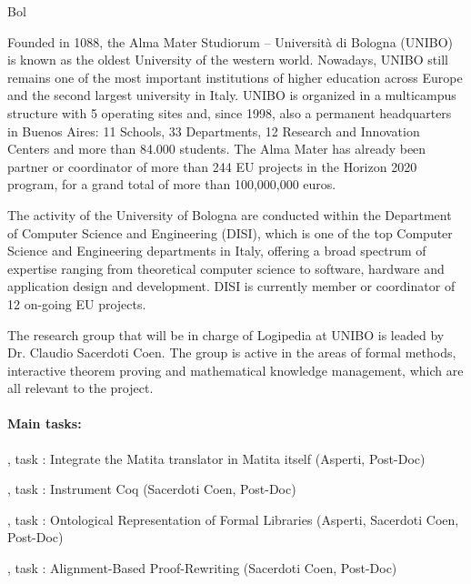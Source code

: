 \begin{sitedescription}{Bol}


Founded in 1088, the Alma Mater Studiorum – Università di Bologna (UNIBO) is known as the oldest University of the western world. Nowadays, UNIBO still remains one of the most important institutions of higher education across Europe and the second largest university in Italy. UNIBO is organized in a multicampus structure with 5 operating sites and, since 1998, also a permanent headquarters in Buenos Aires: 11 Schools, 33 Departments, 12 Research and Innovation Centers and more than 84.000 students. The Alma Mater has already been partner or coordinator of more than 244 EU projects in the Horizon 2020 program, for a grand total of more than 100,000,000 euros.

The activity of the University of Bologna are conducted within the Department of Computer Science and Engineering (DISI), which is one of the top Computer Science and Engineering departments in Italy, offering a broad spectrum of expertise ranging from theoretical computer science to software, hardware and application design and development. DISI is currently member or coordinator of 12 on-going EU projects.

The research group that will be in charge of Logipedia at UNIBO is leaded by Dr. Claudio Sacerdoti Coen. The group is active in the areas of formal methods, interactive theorem proving and mathematical knowledge management, which are all relevant to the project.

\paragraph{Main tasks:}

\begin{compactitem}
\item {}, task : Integrate the Matita translator in Matita itself (Asperti, Post-Doc)
\item {}, task : Instrument Coq (Sacerdoti Coen, Post-Doc)
\item {}, task : Ontological Representation of Formal Libraries (Asperti, Sacerdoti Coen, Post-Doc)
\item {}, task : Alignment-Based  Proof-Rewriting (Sacerdoti Coen, Post-Doc)
\end{compactitem}


\end{sitedescription}
